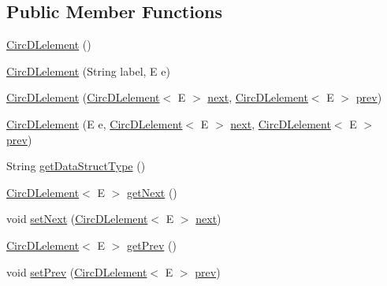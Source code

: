 \subsection*{Public Member Functions}
\begin{DoxyCompactItemize}
\item 
\hyperlink{classbridges_1_1base_1_1_circ_d_lelement_ad14ccb772d52c36802c118f2b3f15d59}{Circ\+D\+Lelement} ()
\item 
\hyperlink{classbridges_1_1base_1_1_circ_d_lelement_a84b2ebf47d2ca24077a800b240d8d157}{Circ\+D\+Lelement} (String label, E e)
\item 
\hyperlink{classbridges_1_1base_1_1_circ_d_lelement_a98a471fc3225ed80595e1ffdb377e336}{Circ\+D\+Lelement} (\hyperlink{classbridges_1_1base_1_1_circ_d_lelement}{Circ\+D\+Lelement}$<$ E $>$ \hyperlink{classbridges_1_1base_1_1_d_lelement_ae2672f6718bf5e1758386d33e59d9340}{next}, \hyperlink{classbridges_1_1base_1_1_circ_d_lelement}{Circ\+D\+Lelement}$<$ E $>$ \hyperlink{classbridges_1_1base_1_1_d_lelement_a6eba4876f820b75ac6bde01d7dea9da7}{prev})
\item 
\hyperlink{classbridges_1_1base_1_1_circ_d_lelement_a86e04c826251be9a1a92c4649844e5e7}{Circ\+D\+Lelement} (E e, \hyperlink{classbridges_1_1base_1_1_circ_d_lelement}{Circ\+D\+Lelement}$<$ E $>$ \hyperlink{classbridges_1_1base_1_1_d_lelement_ae2672f6718bf5e1758386d33e59d9340}{next}, \hyperlink{classbridges_1_1base_1_1_circ_d_lelement}{Circ\+D\+Lelement}$<$ E $>$ \hyperlink{classbridges_1_1base_1_1_d_lelement_a6eba4876f820b75ac6bde01d7dea9da7}{prev})
\item 
String \hyperlink{classbridges_1_1base_1_1_circ_d_lelement_ab4885ae7517f1dd04874270c1c3eaf44}{get\+Data\+Struct\+Type} ()
\item 
\hyperlink{classbridges_1_1base_1_1_circ_d_lelement}{Circ\+D\+Lelement}$<$ E $>$ \hyperlink{classbridges_1_1base_1_1_circ_d_lelement_a9ace56dde1f4c23e9a8798c045100ee6}{get\+Next} ()
\item 
void \hyperlink{classbridges_1_1base_1_1_circ_d_lelement_ae3a0c83ecc08289199344cd440f2ebe4}{set\+Next} (\hyperlink{classbridges_1_1base_1_1_circ_d_lelement}{Circ\+D\+Lelement}$<$ E $>$ \hyperlink{classbridges_1_1base_1_1_d_lelement_ae2672f6718bf5e1758386d33e59d9340}{next})
\item 
\hyperlink{classbridges_1_1base_1_1_circ_d_lelement}{Circ\+D\+Lelement}$<$ E $>$ \hyperlink{classbridges_1_1base_1_1_circ_d_lelement_aa2b83017a571694460f77dd31b4188ed}{get\+Prev} ()
\item 
void \hyperlink{classbridges_1_1base_1_1_circ_d_lelement_ade2cf166a572c051cd284f4e5ba67780}{set\+Prev} (\hyperlink{classbridges_1_1base_1_1_circ_d_lelement}{Circ\+D\+Lelement}$<$ E $>$ \hyperlink{classbridges_1_1base_1_1_d_lelement_a6eba4876f820b75ac6bde01d7dea9da7}{prev})
\end{DoxyCompactItemize}
